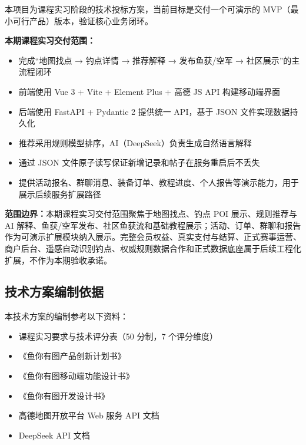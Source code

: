 本项目为课程实习阶段的技术投标方案，当前目标是交付一个可演示的 MVP（最小可行产品）版本，验证核心业务闭环。

\textbf{本期课程实习交付范围：}

\begin{itemize}
  \item 完成“地图找点 → 钓点详情 → 推荐解释 → 发布鱼获/空军 → 社区展示”的主流程闭环
  \item 前端使用 Vue 3 + Vite + Element Plus + 高德 JS API 构建移动端界面
  \item 后端使用 FastAPI + Pydantic 2 提供统一 API，基于 JSON 文件实现数据持久化
  \item 推荐采用规则模型排序，AI（DeepSeek）负责生成自然语言解释
  \item 通过 JSON 文件原子读写保证新增记录和帖子在服务重启后不丢失
  \item 提供活动报名、群聊消息、装备订单、教程进度、个人报告等演示能力，用于展示后续服务扩展路径
\end{itemize}

\textbf{范围边界：}本期课程实习交付范围聚焦于地图找点、钓点 POI 展示、规则推荐与 AI 解释、鱼获/空军发布、社区鱼获流和基础教程展示；活动、订单、群聊和报告作为可演示扩展模块纳入展示。完整会员权益、真实支付与结算、正式赛事运营、商户后台、遥感自动识别钓点、权威规则数据合作和正式数据底座属于后续工程化扩展，不作为本期验收承诺。

\subsection{技术方案编制依据}

本技术方案的编制参考以下资料：

\begin{itemize}
  \item 课程实习要求与技术评分表（50 分制，7 个评分维度）
  \item 《鱼你有图产品创新计划书》
  \item 《鱼你有图移动端功能设计书》
  \item 《鱼你有图开发设计书》
  \item 高德地图开放平台 Web 服务 API 文档
  \item DeepSeek API 文档
\end{itemize}
